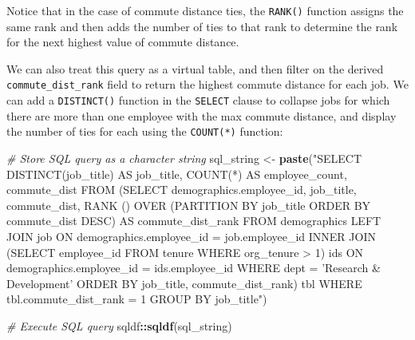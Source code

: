 \documentclass[]{book}
\newenvironment{Shaded}{\begin{snugshade}}{\end{snugshade}}
\newcommand{\CommentTok}[1]{\textcolor[rgb]{0.56,0.35,0.01}{\textit{#1}}}
\newcommand{\KeywordTok}[1]{\textcolor[rgb]{0.13,0.29,0.53}{\textbf{#1}}}
\newcommand{\NormalTok}[1]{#1}
\newcommand{\OperatorTok}[1]{\textcolor[rgb]{0.81,0.36,0.00}{\textbf{#1}}}
\newcommand{\StringTok}[1]{\textcolor[rgb]{0.31,0.60,0.02}{#1}}
\begin{document}
Notice that in the case of commute distance ties, the \texttt{RANK()} function assigns the same rank and then adds the number of ties to that rank to determine the rank for the next highest value of commute distance.

We can also treat this query as a virtual table, and then filter on the derived \texttt{commute\_dist\_rank} field to return the highest commute distance for each job. We can add a \texttt{DISTINCT()} function in the \texttt{SELECT} clause to collapse jobs for which there are more than one employee with the max commute distance, and display the number of ties for each using the \texttt{COUNT(*)} function:

\begin{Shaded}
\begin{Highlighting}[]
\CommentTok{# Store SQL query as a character string}
\NormalTok{sql_string <-}\StringTok{ }\KeywordTok{paste}\NormalTok{(}\StringTok{"SELECT}
\StringTok{                        DISTINCT(job_title) AS job_title,}
\StringTok{                        COUNT(*) AS employee_count,}
\StringTok{                        commute_dist}
\StringTok{                     FROM}
\StringTok{                        (SELECT}
\StringTok{                          demographics.employee_id,}
\StringTok{                          job_title,}
\StringTok{                          commute_dist,}
\StringTok{                          RANK () OVER (PARTITION BY job_title ORDER BY commute_dist DESC) AS commute_dist_rank}
\StringTok{                        FROM}
\StringTok{                            demographics}
\StringTok{                          LEFT JOIN}
\StringTok{                            job}
\StringTok{                          ON}
\StringTok{                            demographics.employee_id = job.employee_id}
\StringTok{                          INNER JOIN}
\StringTok{                            (SELECT employee_id FROM tenure WHERE org_tenure > 1) ids}
\StringTok{                          ON}
\StringTok{                            demographics.employee_id = ids.employee_id}
\StringTok{                        WHERE}
\StringTok{                          dept = 'Research & Development'}
\StringTok{                        ORDER BY}
\StringTok{                          job_title,}
\StringTok{                          commute_dist_rank) tbl}
\StringTok{                      WHERE}
\StringTok{                        tbl.commute_dist_rank = 1}
\StringTok{                      GROUP BY}
\StringTok{                        job_title"}\NormalTok{)}

\CommentTok{# Execute SQL query}
\NormalTok{sqldf}\OperatorTok{::}\KeywordTok{sqldf}\NormalTok{(sql_string)}
\end{Highlighting}
\end{Shaded}
\end{document}
